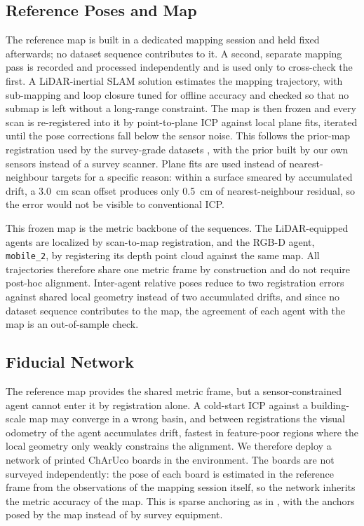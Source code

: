 \documentclass[conference]{IEEEtran}
\begin{document}
\subsection{Reference Poses and Map}
\label{sec:gt}
The reference map is built in a dedicated mapping session and held
fixed afterwards; no dataset sequence contributes to it. A second,
separate mapping pass is recorded and processed independently and is
used only to cross-check the first. A LiDAR-inertial SLAM solution
\cite{glim} estimates the mapping trajectory, with sub-mapping and
loop closure tuned for offline accuracy and checked so that no submap
is left without a long-range constraint. The map is then frozen and
every scan is re-registered into it by point-to-plane ICP against
local plane fits, iterated until the pose corrections fall below the
sensor noise. This follows the prior-map registration used by the
survey-grade datasets \cite{newercollege,oxfordspires,lamar}, with
the prior built by our own sensors instead of a survey scanner. Plane
fits are used instead of nearest-neighbour targets for a specific
reason: within a surface smeared by accumulated drift, a
\SI{3.0}{\centi\metre} scan offset produces only
\SI{0.5}{\centi\metre} of nearest-neighbour residual, so the error
would not be visible to conventional ICP.

This frozen map is the metric backbone of the sequences. The
LiDAR-equipped agents are localized by scan-to-map registration, and
the RGB-D agent, \texttt{mobile\_2}, by registering its depth point
cloud against the same map. All trajectories therefore share one
metric frame by construction and do not require post-hoc alignment.
Inter-agent relative poses reduce to two registration errors against
shared local geometry instead of two accumulated drifts, and since no
dataset sequence contributes to the map, the agreement of each agent
with the map is an out-of-sample check.



\subsection{Fiducial Network}
\label{sec:fiducials}
The reference map provides the shared metric frame, but a
sensor-constrained agent cannot enter it by registration alone. A
cold-start ICP against a building-scale map may converge in a wrong
basin, and between registrations the visual odometry of the agent
accumulates drift, fastest in feature-poor regions where the local
geometry only weakly constrains the alignment. We therefore deploy a
network of printed ChArUco boards in the environment. The boards are
not surveyed independently: the pose of each board is estimated in
the reference frame from the observations of the mapping session
itself, so the network inherits the metric accuracy of the map. This
is sparse anchoring as in \cite{airmuseum}, with the anchors posed by
the map instead of by survey equipment.
\end{document}
